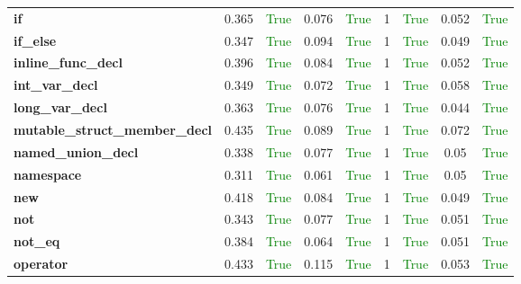 \documentclass{article}
\begin{document}
\begin{xltabular}{\textwidth}{lcccccccc}
\textbf{{\fontsize{10}{12}\selectfont if}}& 0.365&\textcolor{green}{True}& 0.076&\textcolor{green}{True}& 1&\textcolor{green}{True}& 0.052&\textcolor{green}{True} \\[0.5ex]
\textbf{{\fontsize{10}{12}\selectfont if\_else}}& 0.347&\textcolor{green}{True}& 0.094&\textcolor{green}{True}& 1&\textcolor{green}{True}& 0.049&\textcolor{green}{True} \\[0.5ex]
\textbf{{\fontsize{10}{12}\selectfont inline\_func\_decl}}& 0.396&\textcolor{green}{True}& 0.084&\textcolor{green}{True}& 1&\textcolor{green}{True}& 0.052&\textcolor{green}{True} \\[0.5ex]
\textbf{{\fontsize{10}{12}\selectfont int\_var\_decl}}& 0.349&\textcolor{green}{True}& 0.072&\textcolor{green}{True}& 1&\textcolor{green}{True}& 0.058&\textcolor{green}{True} \\[0.5ex]
\textbf{{\fontsize{10}{12}\selectfont long\_var\_decl}}& 0.363&\textcolor{green}{True}& 0.076&\textcolor{green}{True}& 1&\textcolor{green}{True}& 0.044&\textcolor{green}{True} \\[0.5ex]
\textbf{{\fontsize{10}{12}\selectfont mutable\_struct\_member\_decl}}& 0.435&\textcolor{green}{True}& 0.089&\textcolor{green}{True}& 1&\textcolor{green}{True}& 0.072&\textcolor{green}{True} \\[0.5ex]
\textbf{{\fontsize{10}{12}\selectfont named\_union\_decl}}& 0.338&\textcolor{green}{True}& 0.077&\textcolor{green}{True}& 1&\textcolor{green}{True}& 0.05&\textcolor{green}{True} \\[0.5ex]
\textbf{{\fontsize{10}{12}\selectfont namespace}}& 0.311&\textcolor{green}{True}& 0.061&\textcolor{green}{True}& 1&\textcolor{green}{True}& 0.05&\textcolor{green}{True} \\[0.5ex]
\textbf{{\fontsize{10}{12}\selectfont new}}& 0.418&\textcolor{green}{True}& 0.084&\textcolor{green}{True}& 1&\textcolor{green}{True}& 0.049&\textcolor{green}{True} \\[0.5ex]
\textbf{{\fontsize{10}{12}\selectfont not}}& 0.343&\textcolor{green}{True}& 0.077&\textcolor{green}{True}& 1&\textcolor{green}{True}& 0.051&\textcolor{green}{True} \\[0.5ex]
\textbf{{\fontsize{10}{12}\selectfont not\_eq}}& 0.384&\textcolor{green}{True}& 0.064&\textcolor{green}{True}& 1&\textcolor{green}{True}& 0.051&\textcolor{green}{True} \\[0.5ex]
\textbf{{\fontsize{10}{12}\selectfont operator}}& 0.433&\textcolor{green}{True}& 0.115&\textcolor{green}{True}& 1&\textcolor{green}{True}& 0.053&\textcolor{green}{True} \\[0.5ex]

\end{xltabular}
\end{document}
